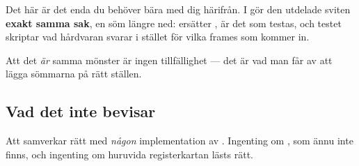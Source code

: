 Det här är det enda du behöver bära med dig härifrån. I  gör den utdelade
sviten \textbf{exakt samma sak}, en söm längre ned:  ersätter ,
 är det som testas, och testet skriptar vad hårdvaran svarar i stället för vilka frames
som kommer in.

Att det \emph{är} samma mönster är ingen tillfällighet --- det är vad man får av att lägga sömmarna
på rätt ställen.

\subsection{Vad det inte bevisar}

Att  samverkar rätt med \emph{någon} implementation av . Ingenting
om , som ännu inte finns, och ingenting om huruvida registerkartan lästs rätt.
